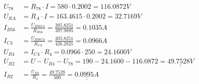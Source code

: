 \begin{figure}[H]
\begin{equation*}
\begin{aligned}
      U_{78}     & = R_{78} \cdot I = 580 \cdot 0.2002 = 116.0872V                                                   \\
      U_{RA}     & = R_A \cdot I = 163.4615 \cdot 0.2002 = 32.7169V                                                 \\ 
      I_{B56}    & = \frac{U_{B56C4}}{R_{B56}} = \frac{205.8251}{397.9895} = 0.1035A                                 \\
      I_{C4}     & = \frac{U_{B56C4}}{R_{C4}} = \frac{205.8251}{426.2821} = 0.0966A                                  \\
      U_{R4}     & = I_{C4} \cdot R_4 = 0.0966 \cdot 250 = 24.1600V                                                  \\
      U_{R2}     & = U - U_{R4} - U_{78} = 190 - 24.1600 - 116.0872 = \underline{\underline{49.7528V}}               \\
      I_{R2}     & = \frac{U_{R2}}{R_2} = \frac{49.7528}{500} = \underline{\underline{0.0995A}}
    \end{aligned}
  \end{equation*}
\end{figure}